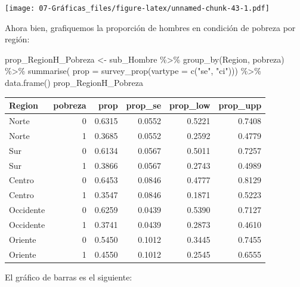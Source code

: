 \documentclass[
  12pt,
]{book}
\newenvironment{Shaded}{\begin{snugshade}}{\end{snugshade}}
\newcommand{\AttributeTok}[1]{\textcolor[rgb]{0.77,0.63,0.00}{#1}}
\newcommand{\FunctionTok}[1]{\textcolor[rgb]{0.00,0.00,0.00}{#1}}
\newcommand{\NormalTok}[1]{#1}
\newcommand{\OtherTok}[1]{\textcolor[rgb]{0.56,0.35,0.01}{#1}}
\newcommand{\SpecialCharTok}[1]{\textcolor[rgb]{0.00,0.00,0.00}{#1}}
\newcommand{\StringTok}[1]{\textcolor[rgb]{0.31,0.60,0.02}{#1}}
\begin{document}
\texttt{[image: 07-Gráficas\_files/figure-latex/unnamed-chunk-43-1.pdf]}

Ahora bien, grafiquemos la proporción de hombres en condición de pobreza por región:

\begin{Shaded}
\begin{Highlighting}[]
\NormalTok{prop\_RegionH\_Pobreza }\OtherTok{\textless{}{-}}\NormalTok{ sub\_Hombre }\SpecialCharTok{\%\textgreater{}\%}
  \FunctionTok{group\_by}\NormalTok{(Region, pobreza) }\SpecialCharTok{\%\textgreater{}\%}
  \FunctionTok{summarise}\NormalTok{(}
    \AttributeTok{prop =} \FunctionTok{survey\_prop}\NormalTok{(}\AttributeTok{vartype =} \FunctionTok{c}\NormalTok{(}\StringTok{"se"}\NormalTok{, }\StringTok{"ci"}\NormalTok{))) }\SpecialCharTok{\%\textgreater{}\%}
  \FunctionTok{data.frame}\NormalTok{()}
\NormalTok{prop\_RegionH\_Pobreza}
\end{Highlighting}
\end{Shaded}

\begin{tabular}{l|r|r|r|r|r}
\hline
Region & pobreza & prop & prop\_se & prop\_low & prop\_upp\\
\hline
Norte & 0 & 0.6315 & 0.0552 & 0.5221 & 0.7408\\
\hline
Norte & 1 & 0.3685 & 0.0552 & 0.2592 & 0.4779\\
\hline
Sur & 0 & 0.6134 & 0.0567 & 0.5011 & 0.7257\\
\hline
Sur & 1 & 0.3866 & 0.0567 & 0.2743 & 0.4989\\
\hline
Centro & 0 & 0.6453 & 0.0846 & 0.4777 & 0.8129\\
\hline
Centro & 1 & 0.3547 & 0.0846 & 0.1871 & 0.5223\\
\hline
Occidente & 0 & 0.6259 & 0.0439 & 0.5390 & 0.7127\\
\hline
Occidente & 1 & 0.3741 & 0.0439 & 0.2873 & 0.4610\\
\hline
Oriente & 0 & 0.5450 & 0.1012 & 0.3445 & 0.7455\\
\hline
Oriente & 1 & 0.4550 & 0.1012 & 0.2545 & 0.6555\\
\hline
\end{tabular}

El gráfico de barras es el siguiente:
\end{document}
